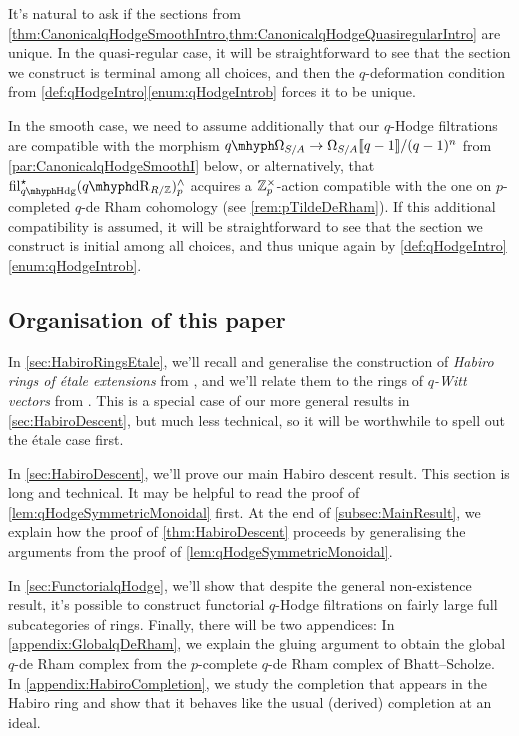 \documentclass[DIV=12,numbers=enddot,leqno,bibliography=totoc]{scrartcl}
\begin{document}
	\begin{numpar}
		It's natural to ask if the sections from \cref{thm:CanonicalqHodgeSmoothIntro,thm:CanonicalqHodgeQuasiregularIntro} are unique. In the quasi-regular case, it will be straightforward to see that the section we construct is terminal among all choices, and then the $q$-deformation condition from \cref{def:qHodgeIntro}\cref{enum:qHodgeIntrob} forces it to be unique.
		
		In the smooth case, we need to assume additionally that our $q$-Hodge filtrations are compatible with the morphism $\qOmega_{S/A}\rightarrow \Omega_{S/A}\qpower/(q-1)^n$ from \cref{par:CanonicalqHodgeSmoothI} below, or alternatively, that $\fil_{\qHodge}^\star(\qdeRham_{R/\IZ})_p^\complete$ acquires a $\mathbb{Z}_p^\times$-action compatible with the one on $p$-completed $q$-de Rham cohomology (see \cref{rem:pTildeDeRham}). If this additional compatibility is assumed, it will be straightforward to see that the section we construct is initial among all choices, and thus unique again by \cref{def:qHodgeIntro}\cref{enum:qHodgeIntrob}.
	\end{numpar}
	
	\subsection{Organisation of this paper}
	In \cref{sec:HabiroRingsEtale}, we'll recall and generalise the construction of \emph{Habiro rings of étale extensions} from \cite{HabiroRingOfNumberField}, and we'll relate them to the rings of \emph{$q$-Witt vectors} from \cite{qWitt}. This is a special case of our more general results in \cref{sec:HabiroDescent}, but much less technical, so it will be worthwhile to spell out the étale case first.
	
	In \cref{sec:HabiroDescent}, we'll prove our main Habiro descent result. This section is long and technical. It may be helpful to read the proof of \cref{lem:qHodgeSymmetricMonoidal} first. At the end of \cref{subsec:MainResult}, we explain how the proof of \cref{thm:HabiroDescent} proceeds by generalising the arguments from the proof of \cref{lem:qHodgeSymmetricMonoidal}.
	
	In \cref{sec:FunctorialqHodge}, we'll show that despite the general non-existence result, it's possible to construct functorial $q$-Hodge filtrations on fairly large full subcategories of rings. Finally, there will be two appendices: In \cref{appendix:GlobalqDeRham}, we explain the gluing argument to obtain the global $q$-de Rham complex from the $p$-complete $q$-de Rham complex of Bhatt--Scholze. In \cref{appendix:HabiroCompletion}, we study the completion that appears in the Habiro ring and show that it behaves like the usual (derived) completion at an ideal.
	
\end{document}
